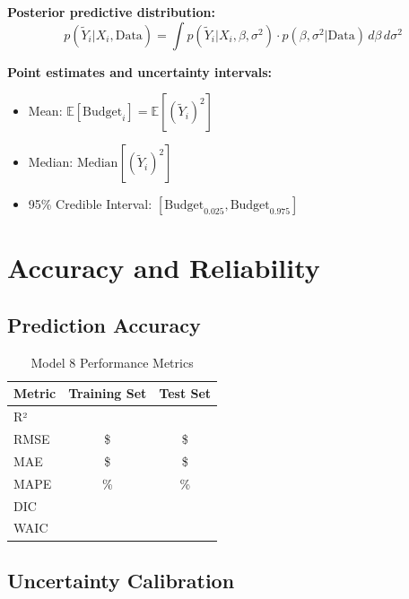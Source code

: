 \textbf{Posterior predictive distribution:}
\begin{equation}
p(\tilde{Y}_i | X_i, \text{Data}) = \int p(\tilde{Y}_i | X_i, \beta, \sigma^2) \cdot p(\beta, \sigma^2 | \text{Data}) \, d\beta \, d\sigma^2
\end{equation}

\textbf{Point estimates and uncertainty intervals:}
\begin{itemize}
    \item Mean: $\mathbb{E}[\text{Budget}_i] = \mathbb{E}[(\tilde{Y}_i)^2]$
    \item Median: $\text{Median}[(\tilde{Y}_i)^2]$
    \item 95\% Credible Interval: $[\text{Budget}_{0.025}, \text{Budget}_{0.975}]$
\end{itemize}

\section{Accuracy and Reliability}

\subsection{Prediction Accuracy}

\begin{table}[h]
\centering
\caption{Model 8 Performance Metrics}
\begin{tabular}{lcc}
\toprule
\textbf{Metric} & \textbf{Training Set} & \textbf{Test Set} \\
\midrule
R² & \ModelEightRSquaredTrain{} & \ModelEightRSquaredTest{} \\
RMSE & \$\ModelEightRMSETrain{} & \$\ModelEightRMSETest{} \\
MAE & \$\ModelEightMAETrain{} & \$\ModelEightMAETest{} \\
MAPE & \ModelEightMAPETrain{}\% & \ModelEightMAPETest{}\% \\
DIC & \multicolumn{2}{c}{\ModelEightDIC{}} \\
WAIC & \multicolumn{2}{c}{\ModelEightWAIC{}} \\
\bottomrule
\end{tabular}
\end{table}

\subsection{Uncertainty Calibration}

